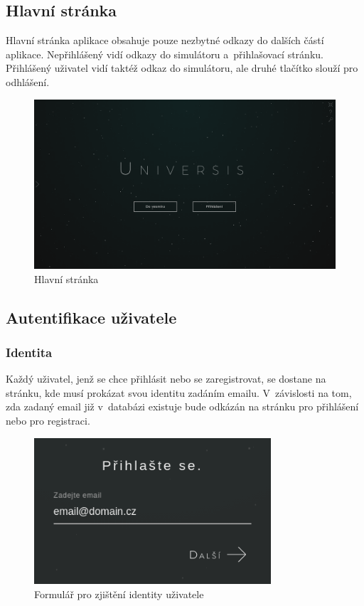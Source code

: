 \documentclass[a4paper,12pt]{article}
\begin{document}
\subsection{Hlavní stránka}

Hlavní stránka aplikace obsahuje pouze nezbytné odkazy do dalších částí aplikace. Nepřihlášený vidí odkazy do simulátoru a~přihlašovací stránku. Přihlášený uživatel vidí taktéž odkaz do simulátoru, ale druhé tlačítko slouží pro odhlášení.

\begin{figure}[H]
\begin{center}
\includegraphics[width=450pt]{Images/MainPage.png}
\caption{Hlavní stránka}
\end{center}
\end{figure}

\subsection{Autentifikace uživatele}

\subsubsection{Identita}

Každý uživatel, jenž se chce přihlásit nebo se zaregistrovat, se dostane na stránku, kde musí prokázat svou identitu zadáním emailu. V~závislosti na tom, zda zadaný email již v~databázi existuje bude odkázán na stránku pro přihlášení nebo pro registraci.

\begin{figure}[H]
\begin{center}
\includegraphics[width=250pt]{Images/Identity.png}
\caption{Formulář pro zjištění identity uživatele}
\label{Identity}
\end{center}
\end{figure}
\end{document}
